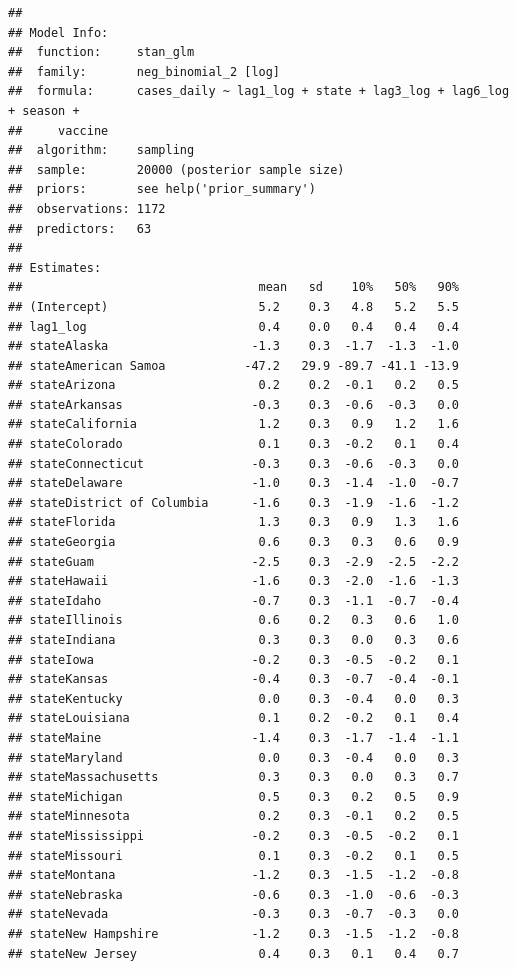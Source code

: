 \documentclass[
]{book}
\begin{document}
\begin{verbatim}
## 
## Model Info:
##  function:     stan_glm
##  family:       neg_binomial_2 [log]
##  formula:      cases_daily ~ lag1_log + state + lag3_log + lag6_log + season + 
##     vaccine
##  algorithm:    sampling
##  sample:       20000 (posterior sample size)
##  priors:       see help('prior_summary')
##  observations: 1172
##  predictors:   63
## 
## Estimates:
##                                 mean   sd    10%   50%   90%
## (Intercept)                     5.2    0.3   4.8   5.2   5.5
## lag1_log                        0.4    0.0   0.4   0.4   0.4
## stateAlaska                    -1.3    0.3  -1.7  -1.3  -1.0
## stateAmerican Samoa           -47.2   29.9 -89.7 -41.1 -13.9
## stateArizona                    0.2    0.2  -0.1   0.2   0.5
## stateArkansas                  -0.3    0.3  -0.6  -0.3   0.0
## stateCalifornia                 1.2    0.3   0.9   1.2   1.6
## stateColorado                   0.1    0.3  -0.2   0.1   0.4
## stateConnecticut               -0.3    0.3  -0.6  -0.3   0.0
## stateDelaware                  -1.0    0.3  -1.4  -1.0  -0.7
## stateDistrict of Columbia      -1.6    0.3  -1.9  -1.6  -1.2
## stateFlorida                    1.3    0.3   0.9   1.3   1.6
## stateGeorgia                    0.6    0.3   0.3   0.6   0.9
## stateGuam                      -2.5    0.3  -2.9  -2.5  -2.2
## stateHawaii                    -1.6    0.3  -2.0  -1.6  -1.3
## stateIdaho                     -0.7    0.3  -1.1  -0.7  -0.4
## stateIllinois                   0.6    0.2   0.3   0.6   1.0
## stateIndiana                    0.3    0.3   0.0   0.3   0.6
## stateIowa                      -0.2    0.3  -0.5  -0.2   0.1
## stateKansas                    -0.4    0.3  -0.7  -0.4  -0.1
## stateKentucky                   0.0    0.3  -0.4   0.0   0.3
## stateLouisiana                  0.1    0.2  -0.2   0.1   0.4
## stateMaine                     -1.4    0.3  -1.7  -1.4  -1.1
## stateMaryland                   0.0    0.3  -0.4   0.0   0.3
## stateMassachusetts              0.3    0.3   0.0   0.3   0.7
## stateMichigan                   0.5    0.3   0.2   0.5   0.9
## stateMinnesota                  0.2    0.3  -0.1   0.2   0.5
## stateMississippi               -0.2    0.3  -0.5  -0.2   0.1
## stateMissouri                   0.1    0.3  -0.2   0.1   0.5
## stateMontana                   -1.2    0.3  -1.5  -1.2  -0.8
## stateNebraska                  -0.6    0.3  -1.0  -0.6  -0.3
## stateNevada                    -0.3    0.3  -0.7  -0.3   0.0
## stateNew Hampshire             -1.2    0.3  -1.5  -1.2  -0.8
## stateNew Jersey                 0.4    0.3   0.1   0.4   0.7

\end{verbatim}
\end{document}
